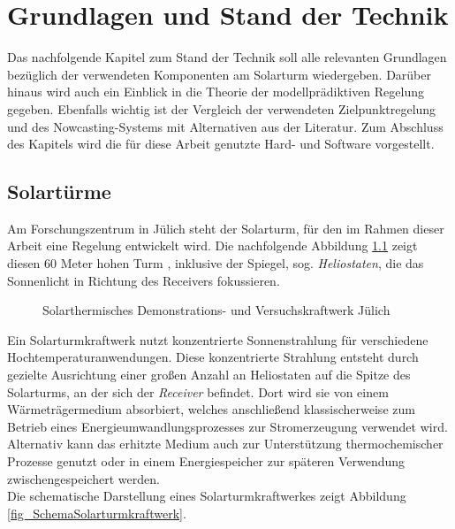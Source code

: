 \chapter{Grundlagen und Stand der Technik} \label{ch_StandTechnik}
Das nachfolgende Kapitel zum Stand der Technik soll alle relevanten Grundlagen bezüglich der verwendeten Komponenten am Solarturm wiedergeben.
Darüber hinaus wird auch ein Einblick in die Theorie der modellprädiktiven Regelung gegeben.
Ebenfalls wichtig ist der Vergleich der verwendeten Zielpunktregelung und des Nowcasting-Systems mit Alternativen aus der Literatur.
Zum Abschluss des Kapitels wird die für diese Arbeit genutzte Hard- und Software vorgestellt.

\section{Solartürme} \label{sec_Solartürme}
Am Forschungszentrum in Jülich steht der Solarturm, für den im Rahmen dieser Arbeit eine Regelung entwickelt wird.
Die nachfolgende Abbildung \ref{fig_Solarturm} zeigt diesen 60 Meter hohen Turm \cite{DLRSolartürmeBild}, inklusive der Spiegel, sog. \textit{Heliostaten}, die das Sonnenlicht in Richtung des Receivers fokussieren.

\begin{figure}[h!]
    \centering
    \setlength{\fboxsep}{1pt}
    \setlength{\fboxrule}{1pt}
\caption[Solarthermisches Demonstrations- und Versuchskraftwerk Jülich]{Solarthermisches Demonstrations- und Versuchskraftwerk Jülich \cite{DLRSolartürmeBild}}
    \label{fig_Solarturm}
\end{figure}

Ein Solarturmkraftwerk nutzt konzentrierte Sonnenstrahlung für verschiedene Hochtemperaturanwendungen.
Diese konzentrierte Strahlung entsteht durch gezielte Ausrichtung einer großen Anzahl an Heliostaten auf die Spitze des Solarturms, an der sich der \textit{Receiver} befindet.
Dort wird sie von einem Wärmeträgermedium absorbiert, welches anschließend klassischerweise zum Betrieb eines Energieumwandlungsprozesses zur Stromerzeugung verwendet wird.
Alternativ kann das erhitzte Medium auch zur Unterstützung thermochemischer Prozesse genutzt oder in einem Energiespeicher zur späteren Verwendung zwischengespeichert werden. \cite[S.11]{DissBelhomme}\\
Die schematische Darstellung eines Solarturmkraftwerkes zeigt Abbildung \ref{fig_SchemaSolarturmkraftwerk}.

